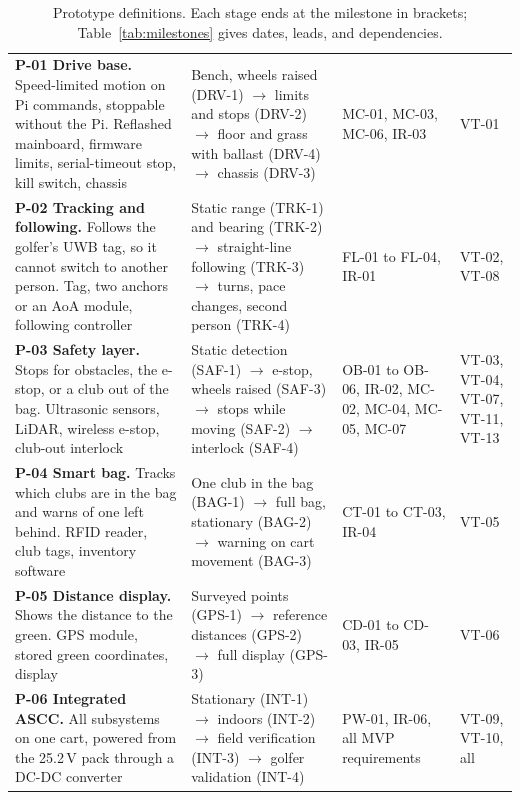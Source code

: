 \label{app:approach}

\begin{table}[!htbp]
\centering
\caption{Prototype definitions. Each stage ends at the milestone in brackets; Table~\ref{tab:milestones} gives dates, leads, and dependencies.}
\label{tab:prototypes}
\footnotesize\renewcommand{\arraystretch}{1.0}
\begin{tabularx}{\linewidth}{@{}L{2.2in} Y L{1.0in} L{0.5in}@{}}
 &  &  &  \\
\midrule
\textbf{P-01 Drive base.} Speed-limited motion on Pi commands, stoppable without the Pi. Reflashed mainboard, firmware limits, serial-timeout stop, kill switch, chassis &
Bench, wheels raised (DRV-1) $\rightarrow$ limits and stops (DRV-2) $\rightarrow$ floor and grass with ballast (DRV-4) $\rightarrow$ chassis (DRV-3) &
MC-01, MC-03, MC-06, IR-03 &
VT-01 \\
\addlinespace[2pt]
\textbf{P-02 Tracking and following.} Follows the golfer's \acs{UWB} tag, so it cannot switch to another person. Tag, two anchors or an \acs{AoA} module, following controller &
Static range (TRK-1) and bearing (TRK-2) $\rightarrow$ straight-line following (TRK-3) $\rightarrow$ turns, pace changes, second person (TRK-4) &
FL-01 to FL-04, IR-01 &
VT-02, VT-08 \\
\addlinespace[2pt]
\textbf{P-03 Safety layer.} Stops for obstacles, the e-stop, or a club out of the bag. Ultrasonic sensors, \acs{LiDAR}, wireless e-stop, club-out interlock &
Static detection (SAF-1) $\rightarrow$ e-stop, wheels raised (SAF-3) $\rightarrow$ stops while moving (SAF-2) $\rightarrow$ interlock (SAF-4) &
OB-01 to OB-06, IR-02, MC-02, MC-04, MC-05, MC-07 &
VT-03, VT-04, VT-07, VT-11, VT-13 \\
\addlinespace[2pt]
\textbf{P-04 Smart bag.} Tracks which clubs are in the bag and warns of one left behind. \acs{RFID} reader, club tags, inventory software &
One club in the bag (BAG-1) $\rightarrow$ full bag, stationary (BAG-2) $\rightarrow$ warning on cart movement (BAG-3) &
CT-01 to CT-03, IR-04 &
VT-05 \\
\addlinespace[2pt]
\textbf{P-05 Distance display.} Shows the distance to the green. \acs{GPS} module, stored green coordinates, display &
Surveyed points (GPS-1) $\rightarrow$ reference distances (GPS-2) $\rightarrow$ full display (GPS-3) &
CD-01 to CD-03, IR-05 &
VT-06 \\
\addlinespace[2pt]
\textbf{P-06 Integrated \acs{ASCC}.} All subsystems on one cart, powered from the 25.2\,V pack through a \acs{DC-DC} converter &
Stationary (INT-1) $\rightarrow$ indoors (INT-2) $\rightarrow$ field verification (INT-3) $\rightarrow$ golfer validation (INT-4) &
PW-01, IR-06, all \acs{MVP} requirements &
VT-09, VT-10, all \\
\bottomrule
\end{tabularx}
\end{table}



